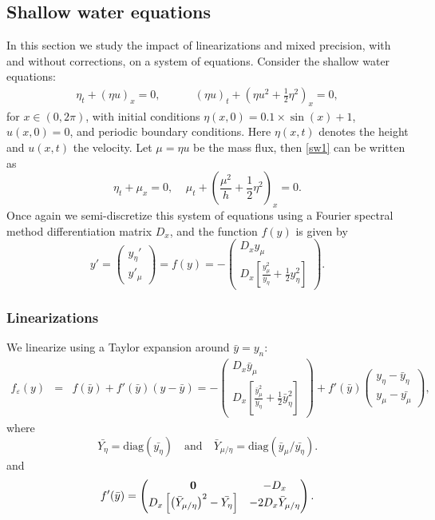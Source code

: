 \documentclass{siamart251104}
\begin{document}
\subsection{Shallow water equations}
In this section we study the impact of linearizations and mixed precision,
with and without corrections, on a system of equations.  
Consider the shallow water equations:
\begin{align} \label{sw1}
\eta_t + (\eta u)_x = 0, \; \; \; \;  & \; \;  \; \; 
(\eta u)_t + \left( \eta u^2 + \frac{1}{2}\eta^2 \right)_x = 0,
\end{align}
for $x \in (0, 2\pi)$, with initial conditions
$\eta(x, 0) = 0.1\times \sin(x) +1$, $u(x, 0) = 0$, and periodic boundary conditions. Here $\eta(x, t)$ denotes the height and $u(x, t)$ the velocity.  
Let $\mu = \eta u$ be the mass flux, then \eqref{sw1} can be written as 
\[ \eta_t + \mu_x = 0, \; \; \; \;
\mu_t  + \left( \frac{\mu^2}{h} + \frac{1}{2}\eta^2 \right)_x = 0. \]
Once again we semi-discretize this system of equations using a Fourier 
spectral method differentiation matrix $D_x$, and the function $f(y)$ is given by 
\[ y' = \begin{pmatrix} y_{\eta}' \\
                y'_{\mu} \end{pmatrix} = f(y) = -\begin{pmatrix}
                    D_xy_\mu\\D_x\left[\frac{y_\mu^2}{y_\eta} + \frac{1}{2}y_\eta^2\right]
                \end{pmatrix}. \]



                
\subsubsection{Linearizations}
We linearize using a Taylor expansion  around
$\bar{y} = y_n$:
\begin{eqnarray} \label{linSW3}
f_\varepsilon(y) &= & f(\bar{y}) + f'(\bar{y})(y - \bar{y}) = -\begin{pmatrix}
                    D_x\bar{y}_\mu\\D_x\left[\frac{\bar{y}_\mu^2}{\bar{y}_\eta} + \frac{1}{2}\bar{y}_\eta^2\right]
                \end{pmatrix} + f'(\bar{y})\begin{pmatrix}
                    y_\eta - \bar{y}_\eta\\ y_\mu - \bar{y_\mu}
                \end{pmatrix},
       \end{eqnarray}
     where  
     \[  \bar{Y_\eta} = \text{diag}(\bar{y_\eta}) \quad \mbox{and} \quad \bar{Y}_{\mu/\eta} = \text{diag}(\bar{y}_\mu/\bar{y_\eta}). \] 
and 
     \begin{equation*}
         f'(\bar{y}) = \begin{pmatrix}
             {\bf 0} & -D_x\\D_x \left[\left(\bar{Y}_{\mu/\eta} \right)^2  - \bar{Y_\eta}  \right] &-2D_x \bar{Y}_{\mu/\eta}
         \end{pmatrix}.
     \end{equation*}
\end{document}
